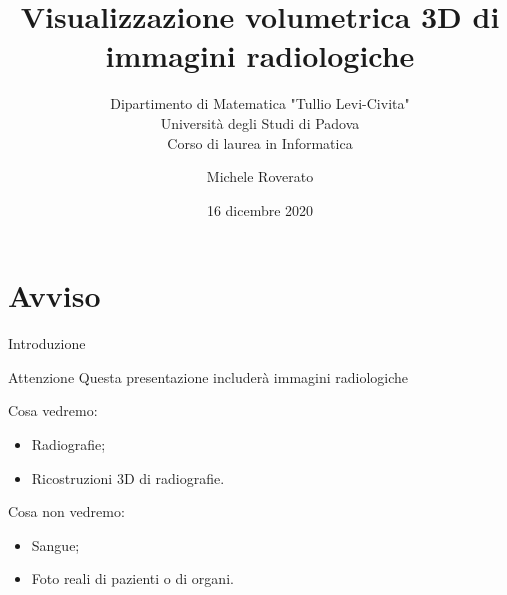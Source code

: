 \documentclass{beamer}
\title{Visualizzazione volumetrica 3D di immagini radiologiche}
\subtitle{
Dipartimento di Matematica "Tullio Levi-Civita"
\\
Università degli Studi di Padova
\\
Corso di laurea in Informatica
}
\author{Michele Roverato}
\date{16 dicembre 2020}
\begin{document}

	\maketitle
	
	
	\section{Avviso}
	\begin{frame}{Introduzione}
	
	\begin{alertblock}{Attenzione}
	Questa presentazione includerà immagini radiologiche
	\end{alertblock}
	
	\begin{multicols}{2}
		Cosa vedremo:
		\begin{itemize}
			\item Radiografie;
			\item Ricostruzioni 3D di radiografie.
		\end{itemize}

		\columnbreak

		Cosa non vedremo:
		\begin{itemize}
			\item Sangue;
			\item Foto reali di pazienti o di organi.
		\end{itemize}
	\end{multicols}
	
	\end{frame}
	

\end{document}
